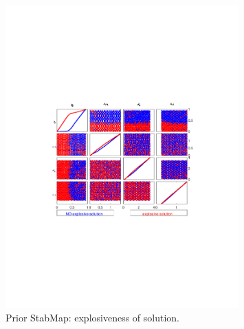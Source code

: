 
\begin{figure}[H]
\centering 
\includegraphics[width=0.8\textwidth]{fiscal/gsa/fiscal_prior_unstable}
\caption{Prior StabMap: explosiveness of solution.}\label{Fig:fiscal_prior_unstable}
\end{figure}

